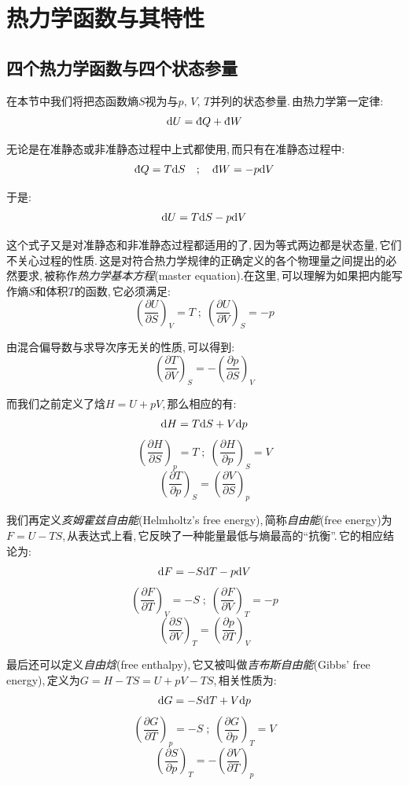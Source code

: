 \section{热力学函数与其特性}

\subsection{四个热力学函数与四个状态参量}

在本节中我们将把态函数熵$S$视为与$p,\,V,\,T$并列的状态参量.\,由热力学第一定律:
\[\ud U=\dbar Q+\dbar W\]

无论是在准静态或非准静态过程中上式都使用,\,而只有在准静态过程中:
\[\dbar Q= T\ud S\quad;\quad \dbar W=-p\ud V\]

于是:
\[\textrm{d} U= T\textrm{d} S -p\textrm{d} V\]

这个式子又是对准静态和非准静态过程都适用的了,\,因为等式两边都是状态量,\,它们不关心过程的性质.\,这是对符合热力学规律的正确定义的各个物理量之间提出的必然要求,\,被称作\emph{热力学基本方程}(master equation).\.在这里,\,可以理解为如果把内能写作熵$S$和体积$T$的函数,\,它必须满足:
\[\left(\frac{\partial U}{\partial S}\right)_V=T\; ; \; \left(\frac{\partial U}{\partial V}\right)_S=-p\]

由混合偏导数与求导次序无关的性质,\,可以得到:
\[\left(\frac{\partial T}{\partial V}\right)_S=-\left(\frac{\partial p}{\partial S}\right)_V\]

而我们之前定义了焓$H=U+pV$,\,那么相应的有:
\[\textrm{d} H= T\textrm{d} S +V\textrm{d} p\]
\[\left(\frac{\partial H}{\partial S}\right)_p=T\; ; \; \left(\frac{\partial H}{\partial p}\right)_S=V\]
\[\left(\frac{\partial T}{\partial p}\right)_S=\left(\frac{\partial V}{\partial S}\right)_p\]

我们再定义\emph{亥姆霍兹自由能}(Helmholtz's free energy),\,简称\emph{自由能}(free energy)为$F=U-TS$,\,从表达式上看,\,它反映了一种能量最低与熵最高的``抗衡''.\,它的相应结论为:
\[\textrm{d} F=- S\textrm{d} T -p\textrm{d} V\]
\[\left(\frac{\partial F}{\partial T}\right)_V=-S\; ; \; \left(\frac{\partial F}{\partial V}\right)_T=-p\]
\[\left(\frac{\partial S}{\partial V}\right)_T=\left(\frac{\partial p}{\partial T}\right)_V\]

最后还可以定义\emph{自由焓}(free enthalpy),\,它又被叫做\emph{吉布斯自由能}(Gibbs' free energy),\,定义为$G=H-TS=U+pV-TS$,\,相关性质为:
\[\textrm{d} G=- S\textrm{d} T +V\textrm{d} p\]
\[\left(\frac{\partial G}{\partial T}\right)_p=-S\; ; \; \left(\frac{\partial G}{\partial p}\right)_T=V\]
\[\left(\frac{\partial S}{\partial p}\right)_T=-\left(\frac{\partial V}{\partial T}\right)_p\]

